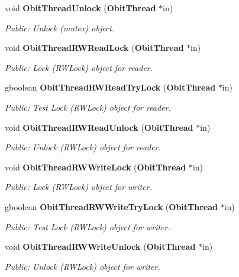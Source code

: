 \begin{CompactItemize}
void {\bf Obit\-Thread\-Unlock} ({\bf Obit\-Thread} $\ast$in)
\begin{CompactList}\small\item\em Public: Unlock (mutex) object. \item\end{CompactList}\item 
void {\bf Obit\-Thread\-RWRead\-Lock} ({\bf Obit\-Thread} $\ast$in)
\begin{CompactList}\small\item\em Public: Lock (RWLock) object for reader. \item\end{CompactList}\item 
gboolean {\bf Obit\-Thread\-RWRead\-Try\-Lock} ({\bf Obit\-Thread} $\ast$in)
\begin{CompactList}\small\item\em Public: Test Lock (RWLock) object for reader. \item\end{CompactList}\item 
void {\bf Obit\-Thread\-RWRead\-Unlock} ({\bf Obit\-Thread} $\ast$in)
\begin{CompactList}\small\item\em Public: Unlock (RWLock) object for reader. \item\end{CompactList}\item 
void {\bf Obit\-Thread\-RWWrite\-Lock} ({\bf Obit\-Thread} $\ast$in)
\begin{CompactList}\small\item\em Public: Lock (RWLock) object for writer. \item\end{CompactList}\item 
gboolean {\bf Obit\-Thread\-RWWrite\-Try\-Lock} ({\bf Obit\-Thread} $\ast$in)
\begin{CompactList}\small\item\em Public: Test Lock (RWLock) object for writer. \item\end{CompactList}\item 
void {\bf Obit\-Thread\-RWWrite\-Unlock} ({\bf Obit\-Thread} $\ast$in)
\begin{CompactList}\small\item\em Public: Unlock (RWLock) object for writer. \item\end{CompactList}\item 

\end{CompactItemize}
